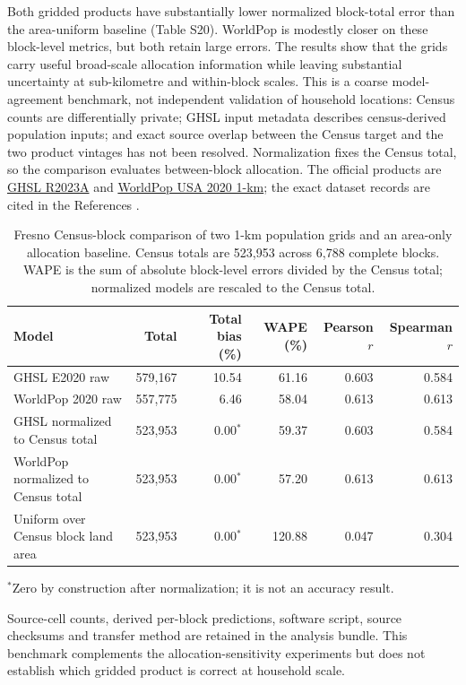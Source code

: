\documentclass[10pt,a4paper]{article}
\begin{document}
Both gridded products have substantially lower normalized block-total error than the area-uniform baseline (Table S20). WorldPop is modestly closer on these block-level metrics, but both retain large errors. The results show that the grids carry useful broad-scale allocation information while leaving substantial uncertainty at sub-kilometre and within-block scales. This is a coarse model-agreement benchmark, not independent validation of household locations: Census counts are differentially private; GHSL input metadata describes census-derived population inputs; and exact source overlap between the Census target and the two product vintages has not been resolved. Normalization fixes the Census total, so the comparison evaluates between-block allocation. The official products are \href{https://human-settlement.emergency.copernicus.eu/ghs_pop2023.php}{GHSL R2023A} and \href{https://hub.worldpop.org/geodata/summary?id=34816}{WorldPop USA 2020 1-km}; the exact dataset records are cited in the References \citep{ghslpopr2023a,worldpopusa2020}.

\begin{table}[htbp]\centering\small
\caption{Fresno Census-block comparison of two 1-km population grids and an area-only allocation baseline. Census totals are 523,953 across 6,788 complete blocks. WAPE is the sum of absolute block-level errors divided by the Census total; normalized models are rescaled to the Census total.}
\begin{tabular}{lrrrrr}\toprule
Model & Total & Total bias (\%) & WAPE (\%) & Pearson $r$ & Spearman $r$ \\\midrule
GHSL E2020 raw & 579,167 & 10.54 & 61.16 & 0.603 & 0.584 \\
WorldPop 2020 raw & 557,775 & 6.46 & 58.04 & 0.613 & 0.613 \\
GHSL normalized to Census total & 523,953 & 0.00$^*$ & 59.37 & 0.603 & 0.584 \\
WorldPop normalized to Census total & 523,953 & 0.00$^*$ & 57.20 & 0.613 & 0.613 \\
Uniform over Census block land area & 523,953 & 0.00$^*$ & 120.88 & 0.047 & 0.304 \\
\bottomrule\end{tabular}
\par\smallskip\footnotesize $^*$Zero by construction after normalization; it is not an accuracy result.
\end{table}

Source-cell counts, derived per-block predictions, software script, source checksums and transfer method are retained in the analysis bundle. This benchmark complements the allocation-sensitivity experiments but does not establish which gridded product is correct at household scale.
\end{document}
